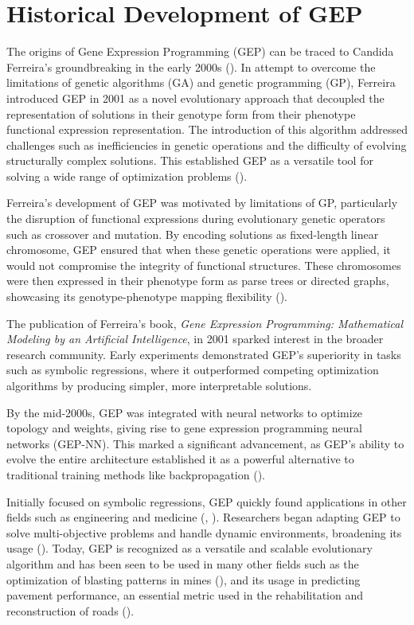 \section{Historical Development of GEP}\label{sec:gep_historical_background}
The origins of Gene Expression Programming (GEP) can be traced to Candida Ferreira's groundbreaking in the early 2000s (\cite{ferreira2006gene}). In attempt to overcome the limitations of genetic algorithms (GA) and genetic programming (GP), Ferreira introduced GEP in 2001 as a novel evolutionary approach that decoupled the representation of solutions in their genotype form from their phenotype functional expression representation. The introduction of this algorithm addressed challenges such as inefficiencies in genetic operations and the difficulty of evolving structurally complex solutions. This established GEP as a versatile tool for solving a wide range of optimization problems (\cite{ferreira2006gene}).

\parbreak\noindent Ferreira's development of GEP was motivated by limitations of GP, particularly the disruption of functional expressions during evolutionary genetic operators such as crossover and mutation. By encoding solutions as fixed-length linear chromosome, GEP ensured that when these genetic operations were applied, it would not compromise the integrity of functional structures. These chromosomes were then expressed in their phenotype form as parse trees or directed graphs, showcasing its genotype-phenotype mapping flexibility (\cite{ferreira2006gene}).

\parbreak\noindent The publication of Ferreira's book, \textit{Gene Expression Programming: Mathematical Modeling by an Artificial Intelligence}, in 2001 sparked interest in the broader research community. Early experiments demonstrated GEP's superiority in tasks such as symbolic regressions, where it outperformed competing optimization algorithms by producing simpler, more interpretable solutions.

\parbreak\noindent By the mid-2000s, GEP was integrated with neural networks to optimize topology and weights, giving rise to gene expression programming neural networks (GEP-NN). This marked a significant advancement, as GEP's ability to evolve the entire architecture established it as a powerful alternative to traditional training methods like backpropagation (\cite{ferreira2006gene}).

\parbreak\noindent Initially focused on symbolic regressions, GEP quickly found applications in other fields such as engineering and medicine (\cite{malik2016application}, \cite{kusy2013application}). Researchers began adapting GEP to solve multi-objective problems and handle dynamic environments, broadening its usage (\cite{zheng2012multi}). Today, GEP is recognized as a versatile and scalable evolutionary algorithm and has been seen to be used in many other fields such as the optimization of blasting patterns in mines (\cite{bayat2022blasting}), and its usage in predicting pavement performance, an essential metric used in the rehabilitation and reconstruction of roads (\cite{mazari2016prediction}).


